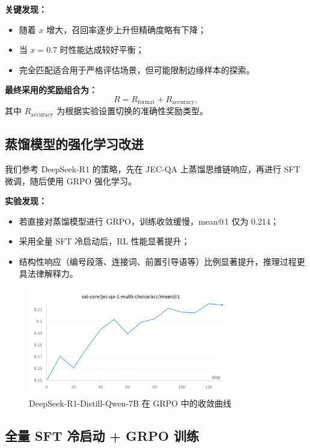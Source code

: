 \documentclass{pkuthesis}
\begin{document}
\textbf{关键发现：}
\begin{itemize}
  \item 随着 $x$ 增大，召回率逐步上升但精确度略有下降；
  \item 当 $x = 0.7$ 时性能达成较好平衡；
  \item 完全匹配适合用于严格评估场景，但可能限制边缘样本的探索。
\end{itemize}

\textbf{最终采用的奖励组合为：}
\[
R = R_{\mathrm{format}} + R_{\mathrm{accuracy}},
\]
其中 $R_{\mathrm{accuracy}}$ 为根据实验设置切换的准确性奖励类型。

\subsection{蒸馏模型的强化学习改进}

我们参考 DeepSeek-R1 的策略，先在 JEC-QA 上蒸馏思维链响应，再进行 SFT 微调，随后使用 GRPO 强化学习。

\textbf{实验发现：}
\begin{itemize}
  \item 若直接对蒸馏模型进行 GRPO，训练收敛缓慢，mean@1 仅为 0.214；
  \item 采用全量 SFT 冷启动后，RL 性能显著提升；
  \item 结构性响应（编号段落、连接词、前置引导语等）比例显著提升，推理过程更具法律解释力。
\end{itemize}

\begin{figure}[h]
  \centering
  \includegraphics[width=0.8\textwidth]{figures/GRPO_DeepSeek-R1-Distill-Qwen-7B.png}
  \caption{DeepSeek-R1-Distill-Qwen-7B 在 GRPO 中的收敛曲线}
  \label{fig:grpo_distill}
\end{figure}

\subsection{全量 SFT 冷启动 + GRPO 训练}
\end{document}
